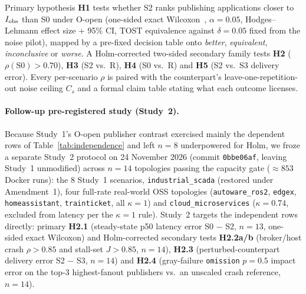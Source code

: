 Primary hypothesis \textbf{H1} tests whether S2 ranks publishing applications closer to $I_{\mathrm{obs}}$ than S0 under O-open (one-sided exact Wilcoxon~\citealp{wilcoxon1945individual}, $\alpha = 0.05$, Hodges--Lehmann effect size + 95\% CI, TOST equivalence against $\delta = 0.05$ fixed from the noise pilot), mapped by a pre-fixed decision table onto \emph{better}, \emph{equivalent}, \emph{inconclusive} or \emph{worse}. A Holm-corrected two-sided secondary family tests \textbf{H2} ($\rho(\mathrm{S0}) > 0.70$), \textbf{H3} (S2 vs.\ R), \textbf{H4} (S0 vs.\ R) and \textbf{H5} (S2 vs.\ S3 delivery error). Every per-scenario $\rho$ is paired with the counterpart's leave-one-repetition-out noise ceiling $C_s$ and a formal claim table stating what each outcome licenses.

\paragraph{Follow-up pre-registered study (Study~2).} Because Study~1's O-open publisher contrast exercised mainly the dependent rows of Table~\ref{tab:independence} and left $n = 8$ underpowered for Holm, we froze a separate Study~2 protocol on 24 November 2026 (commit \texttt{0bbe06af}, leaving Study~1 unmodified) across $n = 14$ topologies passing the capacity gate ($\approx 853$ Docker runs): the 8 Study~1 scenarios, \texttt{industrial\_scada} (restored under Amendment~1), four full-rate real-world OSS topologies (\texttt{autoware\_ros2}, \texttt{edgex}, \texttt{homeassistant}, \texttt{trainticket}, all $\kappa = 1$) and \texttt{cloud\_microservices} ($\kappa = 0.74$, excluded from latency per the $\kappa = 1$ rule). Study~2 targets the independent rows directly: primary \textbf{H2.1} (steady-state p50 latency error S0 $-$ S2, $n = 13$, one-sided exact Wilcoxon) and Holm-corrected secondary tests \textbf{H2.2a/b} (broker/host crash $\rho > 0.85$ and stall-set $J > 0.85$, $n = 14$), \textbf{H2.3} (perturbed-counterpart delivery error S2 $-$ S3, $n = 14$) and \textbf{H2.4} (gray-failure \texttt{omission} $p = 0.5$ impact error on the top-3 highest-fanout publishers vs.\ an unscaled crash reference, $n = 14$).
